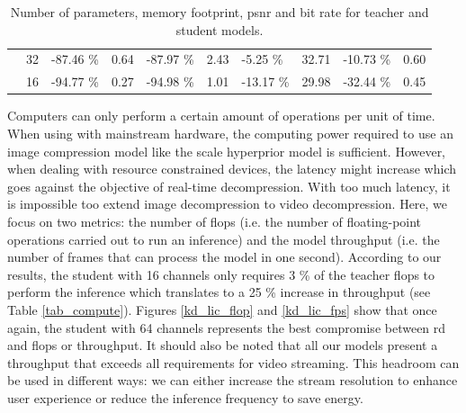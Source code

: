 \begin{table}[]
\begin{tabular}{|c|c|lr|lr|lr|lr|}
                                 & 32                                                           & {\color[HTML]{656565} -87.46 \%}                 & 0.64                                     & {\color[HTML]{656565} -87.97 \%}               & 2.43  & {\color[HTML]{656565} -5.25 \%}  & 32.71 & {\color[HTML]{656565} -10.73 \%} & 0.60 \\ \cline{2-10} 
                                 & 16                                                           & {\color[HTML]{656565} -94.77 \%}                 & 0.27                                     & {\color[HTML]{656565} -94.98 \%}               & 1.01  & {\color[HTML]{656565} -13.17 \%} & 29.98 & {\color[HTML]{656565} -32.44 \%} & 0.45 \\ \hline
    \end{tabular}
    \caption[Number of parameters, memory footprint, \acrshort{psnr} and bit rate for teacher and student models.]{Number of parameters, memory footprint, \acrshort{psnr} and bit rate for teacher and student models.}
    \label{tab_size}
\end{table}

Computers can only perform a certain amount of operations per unit of time. When using with mainstream hardware, the computing power required to use an image compression model like the scale hyperprior model is sufficient. However, when dealing with resource constrained devices, the latency might increase which goes against the objective of real-time decompression. With too much latency, it is impossible too extend image decompression to video decompression. Here, we focus on two metrics: the number of \acrfull{flop}s (i.e. the number of floating-point operations carried out to run an inference) and the model throughput (i.e. the number of frames that can process the model in one second). According to our results, the student with 16 channels only requires 3 \% of the teacher \acrshort{flop}s to perform the inference which translates to a 25 \% increase in throughput (see Table \ref{tab_compute}). Figures \ref{kd_lic_flop} and \ref{kd_lic_fps} show that once again, the student with 64 channels represents the best compromise between \acrshort{rd} and \acrshort{flop}s or throughput. It should also be noted that all our models present a throughput that exceeds all requirements for video streaming. This headroom can be used in different ways: we can either increase the stream resolution to enhance user experience or reduce the inference frequency to save energy. 

